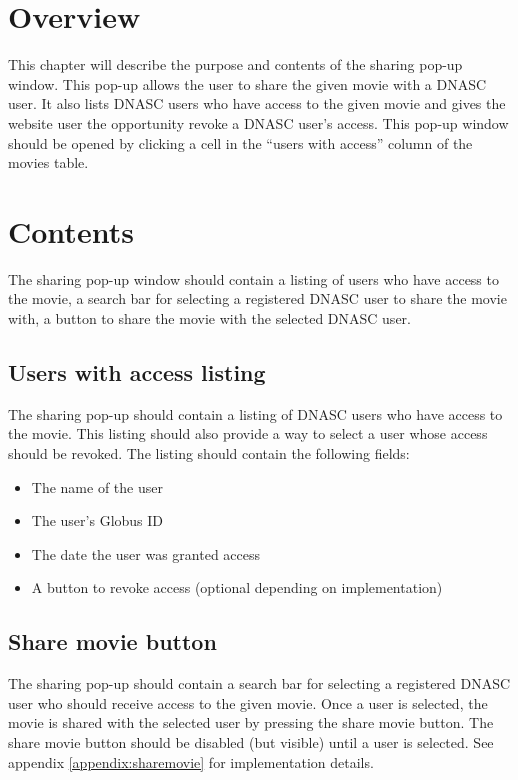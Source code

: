 
\section{Overview}

This chapter will describe the purpose and contents of the sharing pop-up window. This 
pop-up allows the user to share the given movie with a DNASC user. It also lists 
DNASC users who have access to the given movie and gives the website user the opportunity 
revoke a DNASC user's access. This pop-up window should be opened by clicking a cell in 
the ``users with access'' column of the movies table.

\section{Contents}

The sharing pop-up window should contain a listing of users who have access to the movie,
a search bar for selecting a registered DNASC user to share the movie with, a button to 
share the movie with the selected DNASC user.

\subsection{Users with access listing}

The sharing pop-up should contain a listing of DNASC users who have access to the movie.
This listing should also provide a way to select a user whose access should be revoked. 
The listing should contain the following fields:

\begin{itemize}\itemsep1pt
    \item The name of the user
    \item The user's Globus ID
    \item The date the user was granted access
    \item A button to revoke access (optional depending on implementation)
\end{itemize}

\subsection{Share movie button}

The sharing pop-up should contain a search bar for selecting a registered DNASC user 
who should receive access to the given movie. Once a user is selected, the movie is
shared with the selected user by pressing the share movie button. The share movie button 
should be disabled (but visible) until a user is selected. See appendix 
\ref{appendix:sharemovie} for implementation details.
